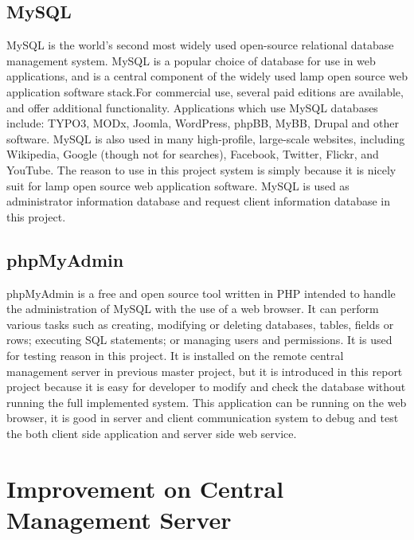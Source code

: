 \subsection{MySQL}
\par MySQL is the world's second most widely used open-source relational database management system. MySQL is a popular choice of database for use in web applications, and is a central component of the widely used \gls{lamp} open source web application software stack.For commercial use, several paid editions are available, and offer additional functionality. Applications which use MySQL databases include: TYPO3, MODx, Joomla, WordPress, phpBB, MyBB, Drupal and other software. MySQL is also used in many high-profile, large-scale websites, including Wikipedia, Google (though not for searches), Facebook, Twitter, Flickr, and YouTube. The reason to use in this project system is simply because it is nicely suit for \gls{lamp} open source web application software. MySQL is used as administrator information database and request client information database in this project.

\subsection{phpMyAdmin}
\par phpMyAdmin is a free and open source tool written in PHP intended to handle the administration of MySQL with the use of a web browser. It can perform various tasks such as creating, modifying or deleting databases, tables, fields or rows; executing SQL statements; or managing users and permissions. It is used for testing reason in this project. It is installed on the remote central management server in previous master project, but it is introduced in this report project because it is easy for developer to modify and check the database without running the full implemented system. This application can be running on the web browser, it is good in server and client communication system to debug and test the both client side application and server side web service.

\section{Improvement on Central Management Server}


